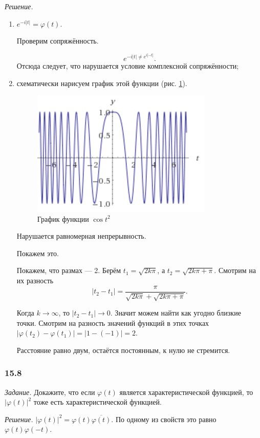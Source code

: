 \textit{Решение.}
\begin{enumerate}[label=\alph*)]
\item $e^{- i \left| t \right| } = \varphi \left( t \right)$.

Проверим сопряжённость.

$$e^{- i \left| t \right| \neq e^{i \left| - t \right| }}.$$
Отсюда следует, что нарушается условие комплексной сопряжённости;
\item схематически нарисуем график этой функции (рис. \ref{fig:157}).

\begin{figure}[h!]
  \centering
  \includegraphics[width=.4\textwidth]{./pictures/15_7.png}
  \caption{График функции $ \cos t^2$}
  \label{fig:157}
\end{figure}

Нарушается равномерная непрерывность.

Покажем это.

Покажем, что размах --- 2.
Берём $t_1 = \sqrt{2k \pi }$, а $t_2 = \sqrt{2k \pi + \pi }$.
Смотрим на их разность
$$ \left| t_2 - t_1 \right| =
\frac{ \pi }{ \sqrt{2k \pi } + \sqrt{2k \pi + \pi }}.$$

Когда $k \rightarrow \infty $, то $ \left| t_2 - t_1 \right| \rightarrow 0$.
Значит можем найти как угодно близкие точки.
Смотрим на разность значений функций в этих точках $ \left| \varphi \left( t_2 \right) - \varphi \left( t_1 \right) \right| = \left| 1 - \left( -1 \right) \right| = 2$.

Расстояние равно двум, остаётся постоянным, к нулю не стремится.
\end{enumerate}

\subsubsection*{15.8}

\textit{Задание.}
Докажите, что если $ \varphi \left( t \right) $ является характеристической функцией, то $ \left| \varphi \left( t \right) \right|^2$ тоже есть характеристической функцией.

\textit{Решение.} $ \left| \varphi \left( t \right) \right|^2 = \varphi \left( t \right) \overline{ \varphi \left( t \right) }$.
По одному из свойств это равно $ \varphi \left( t \right) \varphi \left( - t \right) $.

